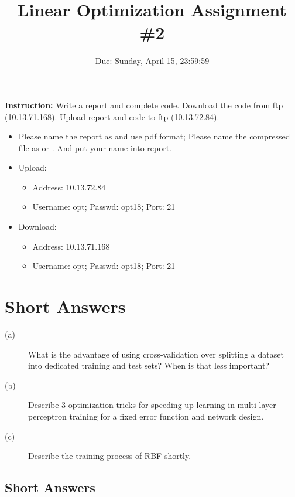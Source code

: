 \documentclass[12pt]{article}
\title{\textbf{Linear Optimization Assignment \#2}}
\author{Due: Sunday, April 15, 23:59:59}
\date{}
\newcommand{\red}[1]{{\color{red}{#1}}}
\providecommand{\tightlist}{%
	\setlength{\itemsep}{0pt}\setlength{\parskip}{0pt}}
\begin{document}
\maketitle

\textbf{\color{NavyBlue}Instruction:} Write a report and complete code.
Download the code from ftp (10.13.71.168). Upload report and code to ftp (10.13.72.84).
\begin{itemize}
	\tightlist
	\item {Please} name the report as \red{hw2\_31xxxxxxxx.pdf} and use pdf format; {Please} name the compressed file as \red{hw2\_31xxxxxxxx.zip} or \red{hw2\_31xxxxxxxx.rar}. And put your name into report.
	\item Upload:
	      \begin{itemize}
		      \tightlist
		      \item    Address: 10.13.72.84
		      \item Username: opt; Passwd:  opt18; Port: 21
	      \end{itemize}
	\item Download:
	      \begin{itemize}
		      \tightlist
		      \item Address: 10.13.71.168
		      \item  Username: opt; Passwd:  opt18; Port: 21
	      \end{itemize}
\end{itemize}

\section{Short Answers}

\begin{description}
	\item[(a)]  What is the advantage of using cross-validation over splitting a dataset into
	      dedicated training and test sets? When is that less important?
	\item[(b)] Describe 3 optimization tricks for speeding up learning in multi-layer perceptron
	      training for a fixed error function and network design.
	\item[(c)] Describe the training process of RBF shortly.
\end{description}

\subsection{Short Answers}
\end{document}
